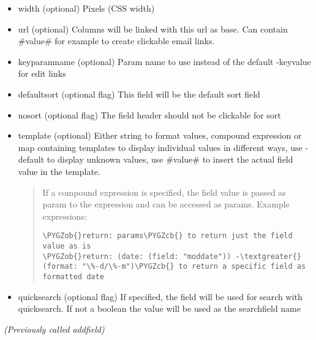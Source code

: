 \documentclass[letterpaper,10pt,english]{sphinxmanual}
\def\PYGZob{\char`\{}
\def\PYGZcb{\char`\}}
\begin{document}
\begin{fulllineitems}
\begin{fulllineitems}
\begin{description}
\begin{itemize}
\item {} 
width (optional)
Pixels (CSS width)

\item {} 
url (optional)
Columns will be linked with this url as base. Can contain \#value\# for example to create clickable email links.

\item {} 
keyparamname (optional)
Param name to use instead of the default -keyvalue for edit links

\item {} 
defaultsort (optional flag)
This field will be the default sort field

\item {} 
nosort (optional flag)
The field header should not be clickable for sort

\item {} 
template (optional)
Either string to format values, compound expression or map containing templates to display individual values in different ways, use -default to display unknown values, use \#value\# to insert the actual field value in the template.
\begin{quote}

If a compound expression is specified, the field value is passed as param to the expression and can be accessed as params.
Example expressions:

\begin{Verbatim}[commandchars=\\\{\}]
\PYGZob{}return: params\PYGZcb{} to return just the field value as is
\PYGZob{}return: (date: (field: "moddate")) -\textgreater{} (format: "\%-d/\%-m")\PYGZcb{} to return a specific field as formatted date
\end{Verbatim}
\end{quote}

\item {} 
quicksearch (optional flag)
If specified, the field will be used for search with quicksearch. If not a boolean the value will be used as the searchfield name

\end{itemize}

\end{description}

\emph{(Previously called addfield)}

\end{fulllineitems}



\end{fulllineitems}
\end{document}
